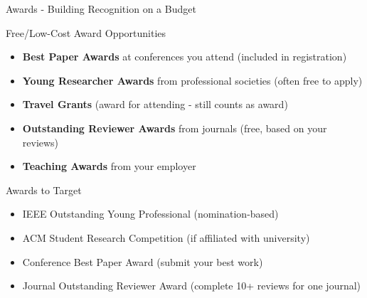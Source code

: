 \documentclass[11pt]{beamer}
\begin{document}
	\begin{frame}{Awards - Building Recognition on a Budget}
		\scriptsize
		\begin{block}{Free/Low-Cost Award Opportunities}
			\begin{itemize}
				\item \textbf{Best Paper Awards} at conferences you attend (included in registration)
				\item \textbf{Young Researcher Awards} from professional societies (often free to apply)
				\item \textbf{Travel Grants} (award for attending - still counts as award)
				\item \textbf{Outstanding Reviewer Awards} from journals (free, based on your reviews)
				\item \textbf{Teaching Awards} from your employer
			\end{itemize}
		\end{block}
		\begin{block}{Awards to Target}
			\begin{itemize}
				\item IEEE Outstanding Young Professional (nomination-based)
				\item ACM Student Research Competition (if affiliated with university)
				\item Conference Best Paper Award (submit your best work)
				\item Journal Outstanding Reviewer Award (complete 10+ reviews for one journal)
			\end{itemize}
		\end{block}
	\end{frame}
	
\end{document}
